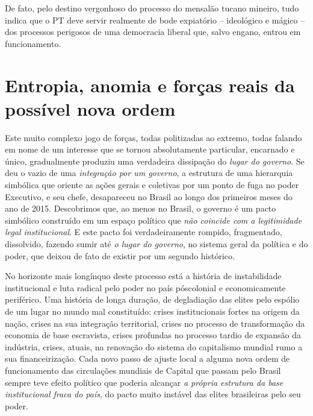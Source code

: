 De fato, pelo destino vergonhoso do processo do mensalão tucano mineiro,
tudo indica que o PT deve servir realmente de bode expiatório --
ideológico e mágico -- dos processos perigosos de uma democracia liberal
que, salvo engano, entrou em funcionamento.

\chapter{Entropia, anomia e forças reais da possível nova
ordem}\label{entropia-anomia-e-foruxe7as-reais-da-possuxedvel-nova-ordem}

Este muito complexo jogo de forças, todas politizadas ao extremo, todas
falando em nome de um interesse que se tornou absolutamente particular,
encarnado e único, gradualmente produziu uma verdadeira dissipação do
\emph{lugar do governo}. Se deu o vazio de uma \emph{integração por um
governo}, a estrutura de uma hierarquia simbólica que oriente as ações
gerais e coletivas por um ponto de fuga no poder Executivo, e seu chefe,
desapareceu no Brasil ao longo dos primeiros meses do ano de 2015.
Descobrimos que, ao menos no Brasil, o governo é um pacto simbólico
construído em um espaço político que \emph{não coincide com a
legitimidade legal institucional}. E este pacto foi verdadeiramente
rompido, fragmentado, dissolvido, fazendo sumir até \emph{o lugar do
governo}, no sistema geral da política e do poder, que deixou de fato de
existir por um segundo histórico.

No horizonte mais longínquo deste processo está a história de
instabilidade institucional e luta radical pelo poder no país
póscolonial e economicamente periférico. Uma história de longa duração,
de degladiação das elites pelo espólio de um lugar no mundo mal
constituído: crises institucionais fortes na origem da nação, crises na
sua integração territorial, crises no processo de transformação da
economia de base escravista, crises profundas no processo tardio de
expansão da indústria, crises, atuais, na renovação do sistema do
capitalismo mundial rumo a sua financeirização. Cada novo passo de
ajuste local a alguma nova ordem de funcionamento das circulações
mundiais de Capital que passam pelo Brasil sempre teve efeito político
que poderia alcançar \emph{a própria estrutura da base institucional
fraca do país}, do pacto muito instável das elites brasileiras pelo seu
poder.

